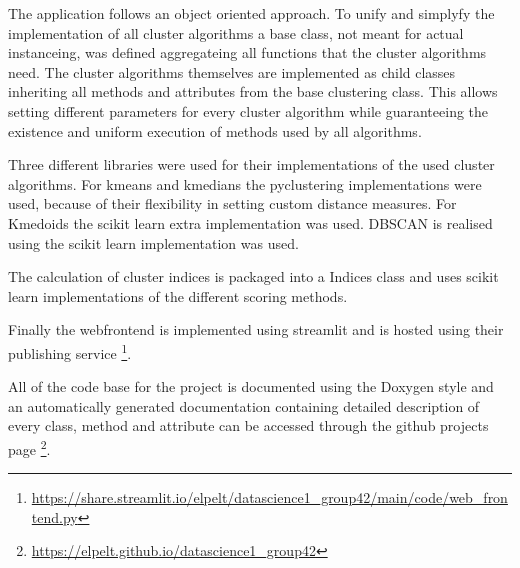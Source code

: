 The application follows an object oriented approach. To unify and simplyfy the implementation of all cluster algorithms a base class, not meant for actual instanceing, was defined aggregateing all functions that the cluster algorithms need.
The cluster algorithms themselves are implemented as child classes inheriting all methods and attributes from the base clustering class. This allows setting different parameters for every cluster algorithm while guaranteeing the existence and uniform execution of methods used by all algorithms.

Three different libraries were used for their implementations of the used cluster algorithms. 
For kmeans and kmedians the pyclustering \cite{Novikov2019} implementations were used, because of their flexibility in setting custom distance measures. 
For Kmedoids the scikit learn extra \cite{scikit-learn-extra} implementation was used.
DBSCAN is realised using the scikit learn implementation \cite{scikitlearn} was used.

The calculation of cluster indices is packaged into a Indices class and uses scikit learn implementations of the different scoring methods.

Finally the webfrontend is implemented using streamlit and is hosted using their publishing service \footnote{\url{https://share.streamlit.io/elpelt/datascience1_group42/main/code/web_frontend.py}}. 

All of the code base for the project is documented using the Doxygen style and an automatically generated documentation containing detailed description of every class, method and attribute can be accessed through the github projects page \footnote{\url{https://elpelt.github.io/datascience1_group42}}.